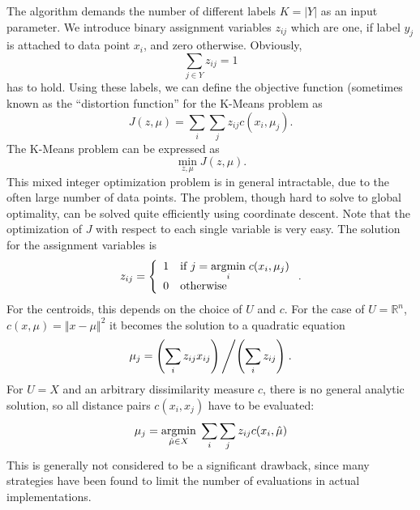 The algorithm demands the number of different labels $K=|Y|$ as an input parameter.
We introduce binary assignment variables $z_{ij}$ which are one, if label $y_j$ is attached to data point $x_i$, and zero otherwise. 
Obviously, 
\[\sum_{j\in Y}z_{ij} = 1\]
has to hold.
Using these labels, we can define the objective function (sometimes known as the ``distortion function'' for the K-Means problem as
\begin{equation}
  \label{eq:5}
  J(z, \mu) = \sum_{i}\sum_{j}z_{ij}c(x_i, \mu_j).
\end{equation}
The K-Means problem can be expressed as
\begin{equation}
  \label{eq:3}
  \min\limits_{z, \mu}J(z, \mu).
\end{equation}
This mixed integer optimization problem is in general intractable, due to the often large number of data points.
The problem, though hard to solve to global optimality, can be solved quite efficiently using coordinate descent.
Note that the optimization of $J$ with respect to each single variable is very easy.
The solution for the assignment variables is
\begin{equation}
  \label{eq:4}
  z_{ij} = \left\{\begin{array}{ll}1&\text{if }j=\underset{i}{\operatorname{argmin}}\; c(x_i,\mu_j)\\0&\text{otherwise} \end{array}\right. .
\end{equation}
For the centroids, this depends on the choice of $U$ and $c$.
For the case of $U=\mathbb{R}^n$, $c(x,\mu) = \Vert x-\mu\Vert^2$ it becomes the solution to a quadratic equation
\begin{equation}
  \label{eq:6}
  \mu_j = \left(\sum_{i}z_{ij}x_{ij}\right)\left / \left(\sum_{i}z_{ij}\right)\right. .
\end{equation}
For $U=X$ and an arbitrary dissimilarity measure $c$, there is no general analytic solution, so all distance pairs $c(x_i, x_j)$ have to be evaluated:
\begin{equation}
  \label{eq:7}
  \mu_j = \underset{\hat{\mu}\in X}{\operatorname{argmin}}\; \sum_{i}\sum_{j}z_{ij}c(x_i,\hat{\mu})
\end{equation}
This is generally not considered to be a significant drawback, since many strategies have been found to limit the number of evaluations in actual implementations.

